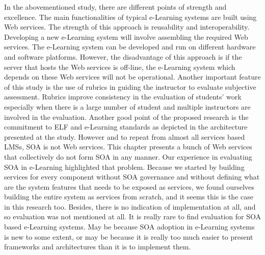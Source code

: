 \documentclass[12pt,a4paper,final,twoside,onecolumn,titlepage]{book}
\begin{document}
In the abovementioned study, there are different points of strength and excellence. The main functionalities of typical e-Learning systems are built using Web services. The strength of this approach is reusability and interoperability. Developing a new e-Learning system will involve assembling the required Web services. The e-Learning system can be developed and run on different hardware and software platforms. However, the disadvantage of this approach is if the server that hosts the Web services is off-line, the e-Learning system which depends on these Web services will not be operational. Another important feature of this study is the use of rubrics in guiding the instructor to evaluate subjective assessment. Rubrics improve consistency in the evaluation of students’ work especially when there is a large number of student and multiple instructors are involved in the evaluation. Another good point of the proposed research is the commitment to \gls{ELF}  and e-Learning standards as depicted in the architecture presented at the study.
However and to repeat from almost all services based \gls{LMS}s, \gls{SOA} is not Web services. This chapter presents a bunch of Web services that collectively do not form \gls{SOA} in any manner. Our experience in evaluating \gls{SOA} in e-Learning highlighted that problem. Because we started by building services for every component without \gls{SOA} governance and without defining what are the system features that needs to be exposed as services, we found ourselves building the entire system as services from scratch, and it seems this is the case in this research too. Besides, there is no indication of implementation at all, and so evaluation was not mentioned at all. It is really rare to find evaluation for \gls{SOA} based e-Learning systems. May be because \gls{SOA} adoption in e-Learning systems is new to some extent, or may be because it is really too much easier to present frameworks and architectures than it is to implement them.
\end{document}

